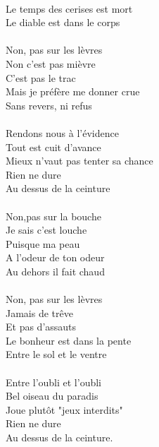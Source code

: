 \\Le temps des cerises est mort
\\Le diable est dans le corps
\\\\Non, pas sur les lèvres
\\Non c'est pas mièvre
\\C'est pas le trac
\\Mais je préfère me donner crue
\\Sans revers, ni refus
\\\\Rendons nous à l'évidence
\\Tout est cuit d'avance
\\Mieux n'vaut pas tenter sa chance
\\Rien ne dure
\\Au dessus de la ceinture
\\\\Non,pas sur la bouche
\\Je sais c'est louche
\\Puisque ma peau
\\A l'odeur de ton odeur
\\Au dehors il fait chaud
\\\\Non, pas sur les lèvres
\\Jamais de trêve
\\Et pas d'assauts
\\Le bonheur est dans la pente
\\Entre le sol et le ventre
\\\\Entre l'oubli et l'oubli
\\Bel oiseau du paradis
\\Joue plutôt "jeux interdits"
\\Rien ne dure
\\Au dessus de la ceinture. 

\breakpage
